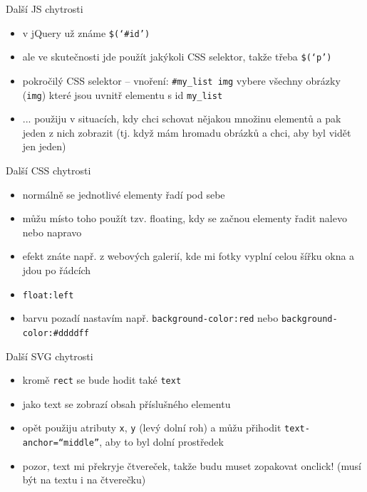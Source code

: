 \documentclass{beamer}
\begin{document}
\begin{frame}{Další JS chytrosti}
  \begin{itemize}
    \item v jQuery už známe \texttt{\$(`\#id')}
    \item ale ve skutečnosti jde použít jakýkoli CSS selektor, takže třeba \texttt{\$(`p')}
    \item pokročilý CSS selektor -- vnoření: \texttt{\#my\_list img} vybere všechny obrázky (\texttt{img}) které jsou uvnitř elementu s id \texttt{my\_list}
    \item ... použiju v situacích, kdy chci schovat nějakou množinu elementů a pak jeden z nich zobrazit (tj. když mám hromadu obrázků a chci, aby byl vidět jen jeden)
  \end{itemize}
\end{frame}

\begin{frame}{Další CSS chytrosti}
  \begin{itemize}
    \item normálně se jednotlivé elementy řadí pod sebe
    \item můžu místo toho použít tzv. floating, kdy se začnou elementy řadit nalevo nebo napravo
    \item efekt znáte např. z webových galerií, kde mi fotky vyplní celou šířku okna a jdou po řádcích
    \item \texttt{float:left}
    \item barvu pozadí nastavím např. \texttt{background-color:red} nebo \texttt{background-color:\#ddddff}
  \end{itemize}
\end{frame}


\begin{frame}{Další SVG chytrosti}
  \begin{itemize}
    \item kromě \texttt{rect} se bude hodit také \texttt{text}
    \item jako text se zobrazí obsah příslušného elementu
    \item opět použiju atributy \texttt{x}, \texttt{y} (levý dolní roh) a můžu přihodit \texttt{text-anchor=``middle''}, aby to byl dolní prostředek
    \item pozor, text mi překryje čtvereček, takže budu muset zopakovat onclick! (musí být na textu i na čtverečku)
  \end{itemize}
\end{frame}
\end{document}
